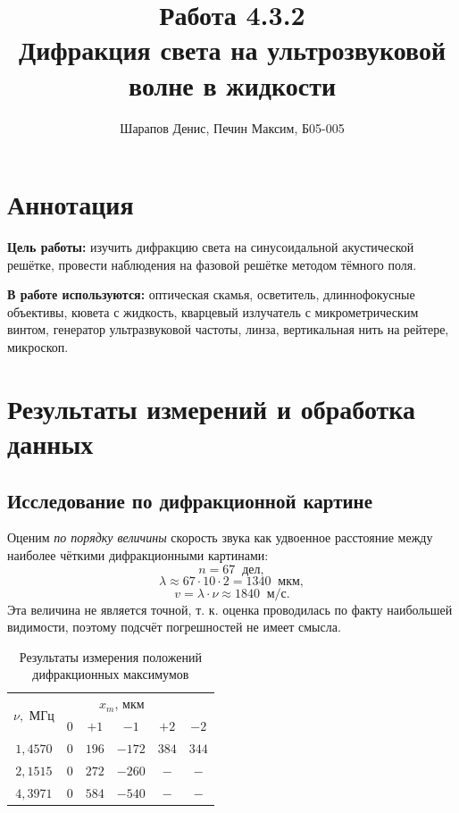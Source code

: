 \documentclass[a4paper]{article}
\title{Работа 4.3.2 \\ Дифракция света на ультрозвуковой волне в жидкости}
\author{Шарапов Денис, Печин Максим, Б05-005}
\date{}
\begin{document}
    \maketitle
    
\section{Аннотация}

\noindent\textbf{Цель работы:} изучить дифракцию света на синусоидальной акустической решётке, провести наблюдения на фазовой решётке методом тёмного поля. \smallskip
 
\noindent \textbf{В работе используются:} оптическая скамья, осветитель, длиннофокусные объективы, кювета с жидкость, кварцевый излучатель с микрометрическим винтом, генератор ультразвуковой частоты, линза, вертикальная нить на рейтере, микроскоп.

\section{Результаты измерений и обработка данных}

\subsection{Исследование по дифракционной картине}

Оценим \emph{по порядку величины} скорость звука как удвоенное расстояние между наиболее чёткими дифракционными картинами:
$$n = 67 \;\;\text{дел},$$
$$\lambda \approx 67\cdot10\cdot2=1340 \;\; \text{мкм},$$
$$v = \lambda \cdot \nu \approx 1840 \;\; \text{м/с}.$$
Эта величина не является точной, т. к. оценка проводилась по факту наибольшей видимости, поэтому подсчёт погрешностей не имеет смысла.

\begin{table}[!ht]
    \centering
    \caption{Результаты измерения положений дифракционных максимумов}
    \begin{tabular}{|c|cccc|c|}
    \hline
    \multirow{2}{*}{$\nu,$ МГц} & \multicolumn{4}{c|}{$x_m$, мкм}                                                               &       \\ \cline{2-6} 
                                & \multicolumn{1}{c|}{$0$} & \multicolumn{1}{c|}{$+1$}  & \multicolumn{1}{c|}{$-1$}   & $+2$  & $-2$  \\ \hline
    $1,4570$                    & \multicolumn{1}{c|}{$0$} & \multicolumn{1}{c|}{$196$} & \multicolumn{1}{c|}{$-172$} & $384$ & $344$ \\ \hline
    $2,1515$                    & \multicolumn{1}{c|}{$0$} & \multicolumn{1}{c|}{$272$} & \multicolumn{1}{c|}{$-260$} & $-$   & $-$   \\ \hline
    $4,3971$                    & \multicolumn{1}{c|}{$0$} & \multicolumn{1}{c|}{$584$} & \multicolumn{1}{c|}{$-540$} & $-$   & $-$   \\ \hline
    \end{tabular}
\end{table}
\end{document}
